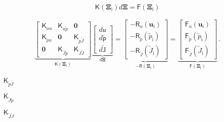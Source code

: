 \documentclass{article}
\begin{document}
\[ \mathbf{\mathsf{K}}( \mathbf{\Xi}_{\textrm{i}}) d\mathbf{\Xi} = \mathbf{ \mathsf{F}}(\mathbf{\Xi}_{\textrm{i}}) \]
\pagebreak

\begin{align*} \underbrace{\begin{bmatrix} \mathbf{\mathsf{K}}_{uu} & \mathbf{\mathsf{K}}_{u\widetilde{p}} & \mathbf{0} \\ \mathbf{\mathsf{K}}_{\widetilde{p}u} & \mathbf{0} & \mathbf{\mathsf{K}}_{\widetilde{p}\widetilde{J}} \\ \mathbf{0} & \mathbf{\mathsf{K}}_{\widetilde{J}\widetilde{p}} & \mathbf{\mathsf{K}}_{\widetilde{J}\widetilde{J}} \end{bmatrix}}_{\mathbf{\mathsf{K}}(\mathbf{\Xi}_{\textrm{i}})} \underbrace{\begin{bmatrix} d \mathbf{\mathsf{u}}\\ d \widetilde{\mathbf{\mathsf{p}}} \\ d \widetilde{\mathbf{\mathsf{J}}} \end{bmatrix}}_{d \mathbf{\Xi}} = \underbrace{\begin{bmatrix} -\mathbf{\mathsf{R}}_{u}(\mathbf{u}_{\textrm{i}}) \\ -\mathbf{\mathsf{R}}_{\widetilde{p}}(\widetilde{p}_{\textrm{i}}) \\ -\mathbf{\mathsf{R}}_{\widetilde{J}}(\widetilde{J}_{\textrm{i}}) \end{bmatrix}}_{ -\mathbf{\mathsf{R}}(\mathbf{\Xi}_{\textrm{i}}) } = \underbrace{\begin{bmatrix} \mathbf{\mathsf{F}}_{u}(\mathbf{u}_{\textrm{i}}) \\ \mathbf{\mathsf{F}}_{\widetilde{p}}(\widetilde{p}_{\textrm{i}}) \\ \mathbf{\mathsf{F}}_{\widetilde{J}}(\widetilde{J}_{\textrm{i}}) \end{bmatrix}}_{ \mathbf{\mathsf{F}}(\mathbf{\Xi}_{\textrm{i}}) } \, . \end{align*}
\pagebreak

$\mathbf{\mathsf{K}}_{\widetilde{p}\widetilde{J}}$
\pagebreak

$\mathbf{\mathsf{K}}_{\widetilde{J}\widetilde{p}}$
\pagebreak

$\mathbf{\mathsf{K}}_{\widetilde{J}\widetilde{J}}$
\pagebreak
\end{document}
